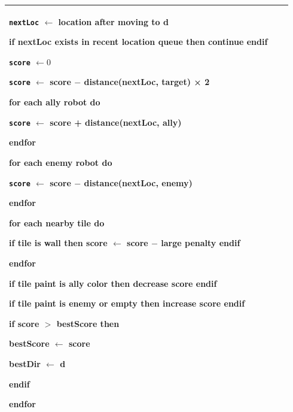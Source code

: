 \documentclass{article}
\newenvironment{pseudobox}
{
\centering
\begin{longtable}{|p{0.94\linewidth}|}
\hline
}
{
\\ \hline
\end{longtable}
\vspace{0.05cm}
}
\begin{document}
\begin{enumerate}[label=\alph*.]
\begin{pseudobox}
\hspace*{3em}\texttt{nextLoc} $\leftarrow$ location after moving to d

\hspace*{3em}if nextLoc exists in recent location queue then continue endif

\hspace*{3em}\texttt{score} $\leftarrow 0$

\hspace*{3em}\texttt{score} $\leftarrow$ score $-$ distance(nextLoc, target) × 2

\hspace*{3em}for each ally robot do

\hspace*{4.5em}\texttt{score} $\leftarrow$ score + distance(nextLoc, ally)

\hspace*{3em}endfor

\hspace*{3em}for each enemy robot do

\hspace*{4.5em}\texttt{score} $\leftarrow$ score $-$ distance(nextLoc, enemy)

\hspace*{3em}endfor

\hspace*{3em}for each nearby tile do

\hspace*{4.5em}if tile is wall then score $\leftarrow$ score $-$ large penalty endif

\hspace*{3em}endfor

\hspace*{3em}if tile paint is ally color then decrease score endif

\hspace*{3em}if tile paint is enemy or empty then increase score endif

\hspace*{3em}if score $>$ bestScore then

\hspace*{4.5em}bestScore $\leftarrow$ score

\hspace*{4.5em}bestDir $\leftarrow$ d

\hspace*{3em}endif

\hspace*{1.5em}endfor


\end{pseudobox}
\end{enumerate}
\end{document}
